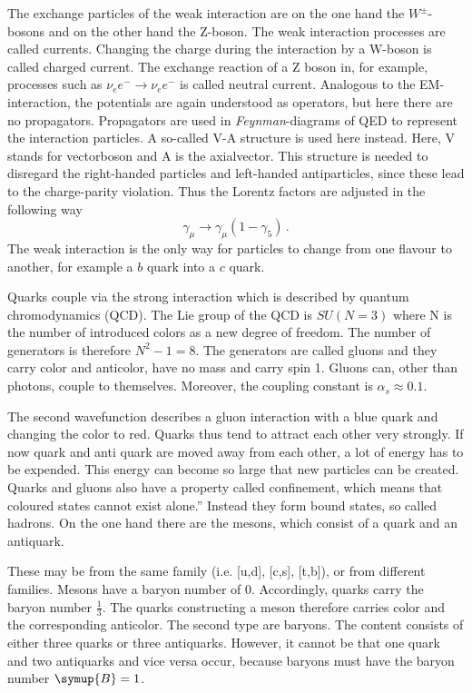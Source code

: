 The exchange particles of the weak interaction are on the one hand the $W^{\pm}$-bosons and on the other hand the Z-boson.
The weak interaction processes are called currents.
Changing the charge during the interaction by a W-boson is called charged current.
The exchange reaction of a Z boson in, for example, processes such as $\nu_{e} e^{-} \to \nu_{e} e^{-}$ is called neutral current.
Analogous to the EM-interaction, the potentials are again understood as
operators, but here there are no propagators. Propagators are
used in \textit{Feynman}-diagrams of QED to represent the interaction particles.
A so-called V-A structure is used here instead. Here, V stands for vectorboson and A is the axialvector.
This structure is needed to disregard the right-handed particles and left-handed
antiparticles, since these lead to the charge-parity violation. Thus the Lorentz factors are adjusted in the following way
\begin{equation*}
  \gamma_{\mu} \to \gamma_{\mu}(1 - \gamma_5)\,.
\end{equation*}
The weak interaction is the only way for particles to change from one flavour to another, for example a $b$ quark into a $c$ quark.

Quarks couple via the strong interaction which is described by quantum chromodynamics (QCD). The Lie group of the QCD is $SU\left(N = 3\right)$ where N is the number of introduced colors as a new degree of freedom. The number of generators is therefore $N^2 - 1 = 8$.
The generators are called gluons and they carry color and anticolor, have no mass and carry spin 1.
Gluons can, other than photons, couple to themselves.
Moreover, the coupling constant is $\alpha_s \approx 0.1$.

The second wavefunction describes a gluon interaction with a blue quark and changing the color to red.
Quarks thus tend to attract each other very strongly. If now
quark and anti quark are moved away from each other, a lot of energy has to be expended. This energy can become so large that new particles can be created.
Quarks and gluons also have a property called confinement, which means that coloured states cannot exist alone.” Instead they form bound states, so called hadrons. On the one hand there are the mesons, which consist of a quark
and an antiquark.

These may be from the same family (i.e. [u,d], [c,s], [t,b]), or from
different families. Mesons have a baryon number of 0. Accordingly, quarks carry the baryon number $\frac{1}{3}$. The quarks constructing a meson therefore carries color and the corresponding anticolor.
The second type are baryons. The content consists of either three quarks or
three antiquarks. However, it cannot be that one quark and two antiquarks
and vice versa occur, because baryons must have the baryon number $\symup{B} = 1$.

